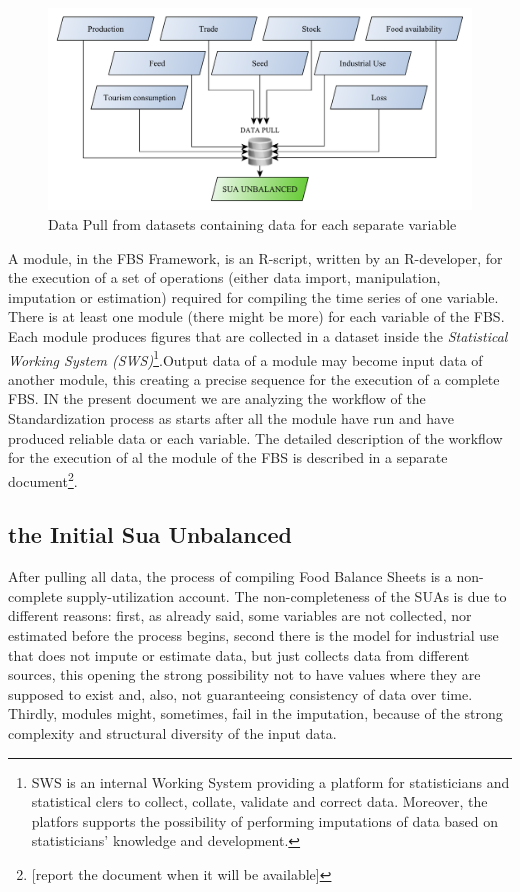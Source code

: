\documentclass[]{article}
\let\rmarkdownfootnote\footnote%
\def\footnote{\protect\rmarkdownfootnote}
\begin{document}
\begin{figure}[htbp]
\centering
\includegraphics{images/01_pulldata.pdf}
\caption{\label{fig:f1}Data Pull from datasets containing data for each
separate variable}
\end{figure}

A module, in the FBS Framework, is an R-script, written by an
R-developer, for the execution of a set of operations (either data
import, manipulation, imputation or estimation) required for compiling
the time series of one variable. There is at least one module (there
might be more) for each variable of the FBS. Each module produces
figures that are collected in a dataset inside the \emph{Statistical
Working System (SWS)}\footnote{SWS is an internal Working System
  providing a platform for statisticians and statistical clers to
  collect, collate, validate and correct data. Moreover, the platfors
  supports the possibility of performing imputations of data based on
  statisticians' knowledge and development.}.Output data of a module may
become input data of another module, this creating a precise sequence
for the execution of a complete FBS. IN the present document we are
analyzing the workflow of the Standardization process as starts after
all the module have run and have produced reliable data or each
variable. The detailed description of the workflow for the execution of
al the module of the FBS is described in a separate document\footnote{{[}report
  the document when it will be available{]}}.

\subsection{the Initial Sua
Unbalanced}\label{the-initial-sua-unbalanced}

After pulling all data, the process of compiling Food Balance Sheets is
a non-complete supply-utilization account. The non-completeness of the
SUAs is due to different reasons: first, as already said, some variables
are not collected, nor estimated before the process begins, second there
is the model for industrial use that does not impute or estimate data,
but just collects data from different sources, this opening the strong
possibility not to have values where they are supposed to exist and,
also, not guaranteeing consistency of data over time. Thirdly, modules
might, sometimes, fail in the imputation, because of the strong
complexity and structural diversity of the input data.
\end{document}

